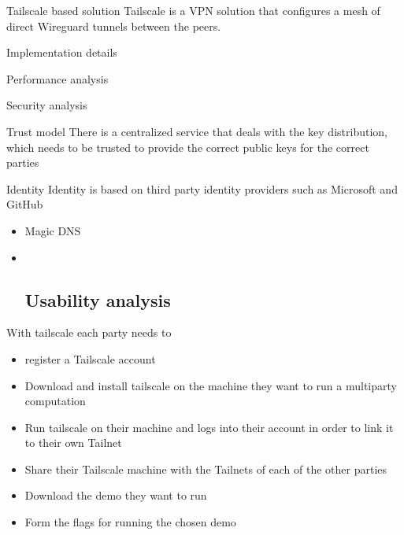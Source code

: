 \label{thesis__070-tailscale.md}
\begin{block}{Tailscale based solution}
\label{thesis__070-tailscale.md__tailscale-based-solution}
Tailscale is a VPN solution that configures a mesh of direct Wireguard tunnels between the peers.

\begin{block}{Implementation details}
\label{thesis__070-tailscale.md__implementation-details}
\end{block}

\begin{block}{Performance analysis}
\label{thesis__070-tailscale.md__performance-analysis}
\end{block}

\begin{block}{Security analysis}
\label{thesis__070-tailscale.md__security-analysis}
\begin{block}{Trust model}
\label{thesis__070-tailscale.md__trust-model}
There is a centralized service that deals with the key distribution, which needs to be trusted to provide the correct public keys for the correct parties
\end{block}

\begin{block}{Identity}
\label{thesis__070-tailscale.md__identity}
Identity is based on third party identity providers such as Microsoft and GitHub

\begin{itemize}
\item
  Magic DNS
\item ~
  \subsection{Usability analysis}\label{thesis__070-tailscale.md__usability-analysis}
\end{itemize}

With tailscale each party needs to

\begin{itemize}
\tightlist
\item
  register a Tailscale account
\item
  Download and install tailscale on the machine they want to run a multiparty computation
\item
  Run tailscale on their machine and logs into their account in order to link it to their own Tailnet
\item
  Share their Tailscale machine with the Tailnets of each of the other parties
\item
  Download the demo they want to run
\item
  Form the flags for running the chosen demo


\end{itemize}
\end{block}
\end{block}
\end{block}
